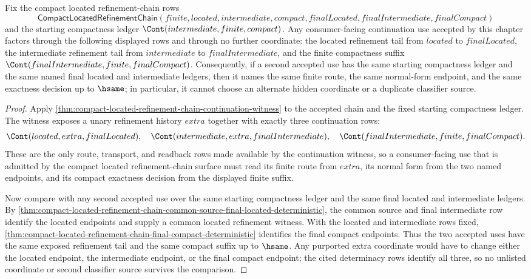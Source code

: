 
\begin{corollary}
\label{cor:compact-located-refinement-chain-continuation-determinacy}
Fix the compact located refinement-chain rows
$$
\mathsf{CompactLocatedRefinementChain}(finite,located,intermediate,compact,
finalLocated,finalIntermediate,finalCompact)
$$
and the starting compactness ledger $\Cont(intermediate,finite,compact)$. Any
consumer-facing continuation use accepted by this chapter factors through the
following displayed rows and through no further coordinate: the located
refinement tail from $located$ to $finalLocated$, the intermediate refinement
tail from $intermediate$ to $finalIntermediate$, and the finite compactness
suffix $\Cont(finalIntermediate,finite,finalCompact)$. Consequently, if a second
accepted use has the same starting compactness ledger and the same named final
located and intermediate ledgers, then it names the same finite route, the same
normal-form endpoint, and the same exactness decision up to $\hsame$; in
particular, it cannot choose an alternate hidden coordinate or a duplicate
classifier source.
\end{corollary}
\begin{proof}
Apply \autoref{thm:compact-located-refinement-chain-continuation-witness} to the
accepted chain and the fixed starting compactness ledger. The witness exposes a
unary refinement history $extra$ together with exactly three continuation rows:
$$
\Cont(located,extra,finalLocated),\quad
\Cont(intermediate,extra,finalIntermediate),\quad
\Cont(finalIntermediate,finite,finalCompact).
$$
These are the only route, transport, and readback rows made available by the
continuation witness, so a consumer-facing use that is admitted by the compact
located refinement-chain surface must read its finite route from $extra$, its
normal form from the two named endpoints, and its compact exactness decision
from the displayed finite suffix.

Now compare with any second accepted use over the same starting compactness
ledger and the same final located and intermediate ledgers. By
\autoref{thm:compact-located-refinement-chain-common-source-final-located-deterministic},
the common source and final intermediate row identify the located endpoints and
supply a common located refinement witness. With the located and intermediate
rows fixed, \autoref{thm:compact-located-refinement-chain-final-compact-deterministic}
identifies the final compact endpoints. Thus the two accepted uses have the
same exposed refinement tail and the same compact suffix up to $\hsame$. Any
purported extra coordinate would have to change either the located endpoint,
the intermediate endpoint, or the final compact endpoint; the cited determinacy
rows identify all three, so no unlisted coordinate or second classifier source
survives the comparison.
\end{proof}

